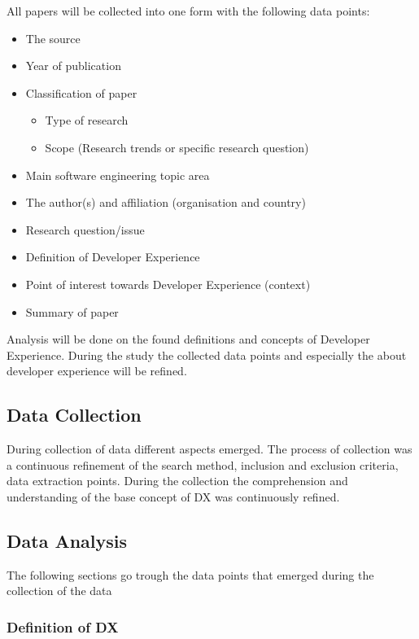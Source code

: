 \documentclass[english, 12pt, a4paper, sci, utf8, a-1b, online]{aaltothesis}
\begin{document}
All papers will be collected into one form with the following data points:

\begin{itemize}
  \item The source
  \item Year of publication
  \item Classification of paper
        \begin{itemize}
          \item Type of research
          \item Scope (Research trends or specific research question)
        \end{itemize}
  \item Main software engineering topic area
  \item The author(s) and affiliation (organisation and country)
  \item Research question/issue
  \item Definition of Developer Experience
  \item Point of interest towards Developer Experience (context)
  \item Summary of paper
\end{itemize}

Analysis will be done on the found definitions and concepts of Developer Experience. During the study the collected data points and especially the about developer experience will be refined.

\subsection{Data Collection}

During collection of data different aspects emerged. The process of collection was a continuous refinement of the search method, inclusion and exclusion criteria, data extraction points. During the collection the comprehension and understanding of the base concept of DX was continuously refined.   

\subsection{Data Analysis}

The following sections go trough the data points that emerged during the collection of the data

\subsubsection{Definition of DX}
\end{document}
